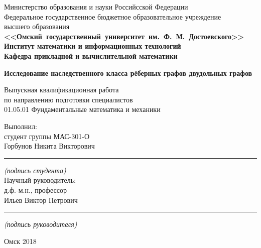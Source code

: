 \documentclass[12pt]{article}
\begin{document}
	
	
	\begin{titlepage}
		\thispagestyle{empty}
		\begin{center}
			{
				Министерство образования и науки Российсской Федерации\\
				Федеральное государственное бюджетное образовательное учреждение\\
				высшего образования\\
				\textbf{ <<Омский~государственный~университет~им.~Ф.~М.~Достоевского>>\\
					Институт математики и информационных технологий\\
					Кафедра прикладной и вычислительной математики\\[3.0cm] }
			}
			
			\textbf{\Large Исследование наследственного класса рёберных графов двудольных графов\\[10pt]}
			
			Выпускная квалификационная работа\\
			по направлению подготовки специалистов\\
			01.05.01 Фундаментальные математика и механики\\[2.0cm]
			
			\begin{flushright}
				\begin{minipage}{0.4\textwidth}
					Выполнил:\\
					студент группы МАС-301-О\\
					Горбунов Никита Викторович\\[8pt]
					\hrule \par\smallskip
					{\it (подпись студента)}\\[10pt]
					Научный руководитель:\\
					д.ф.-м.н., профессор\\
					Ильев Виктор Петрович\\[8pt]
					\hrule \par\smallskip
					{\it (подпись руководителя)}
				\end{minipage}
			\end{flushright}
			
			\vfill
			\vspace{7mm}
			{\large Омск 2018}
			
		\end{center}
	\end{titlepage}
	
	
	
\end{document}
